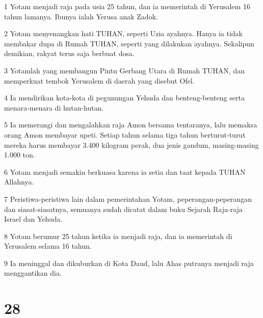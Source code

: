 \par 1 Yotam menjadi raja pada usia 25 tahun, dan ia memerintah di Yerusalem 16 tahun lamanya. Ibunya ialah Yerusa anak Zadok.
\par 2 Yotam menyenangkan hati TUHAN, seperti Uzia ayahnya. Hanya ia tidak membakar dupa di Rumah TUHAN, seperti yang dilakukan ayahnya. Sekalipun demikian, rakyat terus saja berbuat dosa.
\par 3 Yotamlah yang membangun Pintu Gerbang Utara di Rumah TUHAN, dan memperkuat tembok Yerusalem di daerah yang disebut Ofel.
\par 4 Ia mendirikan kota-kota di pegunungan Yehuda dan benteng-benteng serta menara-menara di hutan-hutan.
\par 5 Ia memerangi dan mengalahkan raja Amon bersama tentaranya, lalu memaksa orang Amon membayar upeti. Setiap tahun selama tiga tahun berturut-turut mereka harus membayar 3.400 kilogram perak, dua jenis gandum, masing-masing 1.000 ton.
\par 6 Yotam menjadi semakin berkuasa karena ia setia dan taat kepada TUHAN Allahnya.
\par 7 Peristiwa-peristiwa lain dalam pemerintahan Yotam, peperangan-peperangan dan siasat-siasatnya, semuanya sudah dicatat dalam buku Sejarah Raja-raja Israel dan Yehuda.
\par 8 Yotam berumur 25 tahun ketika ia menjadi raja, dan ia memerintah di Yerusalem selama 16 tahun.
\par 9 Ia meninggal dan dikuburkan di Kota Daud, lalu Ahas putranya menjadi raja menggantikan dia.

\chapter{28}

